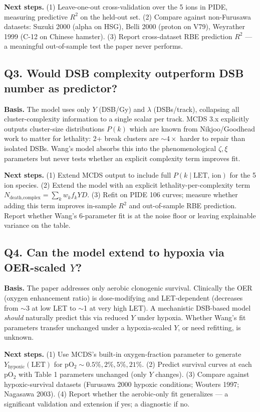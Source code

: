 \textbf{Next steps.} (1) Leave-one-out cross-validation over the 5 ions in PIDE, measuring predictive $R^2$ on the held-out set. (2) Compare against non-Furusawa datasets: Suzuki 2000 (alpha on HSG), Belli 2000 (proton on V79), Weyrather 1999 (C-12 on Chinese hamster). (3) Report cross-dataset RBE prediction $R^2$ --- a meaningful out-of-sample test the paper never performs.

\subsection*{Q3. Would DSB complexity outperform DSB number as predictor?}

\textbf{Basis.} The model uses only $Y$ (DSB/Gy) and $\lambda$ (DSBs/track), collapsing all cluster-complexity information to a single scalar per track. MCDS 3.x explicitly outputs cluster-size distributions $P(k)$ which are known from Nikjoo/Goodhead work to matter for lethality: 2+ break clusters are $\sim 4\times$ harder to repair than isolated DSBs. Wang's model absorbs this into the phenomenological $\zeta,\xi$ parameters but never tests whether an explicit complexity term improves fit.

\textbf{Next steps.} (1) Extend MCDS output to include full $P(k \mid \text{LET, ion})$ for the 5 ion species. (2) Extend the model with an explicit lethality-per-complexity term $N_{\text{death,complex}} = \sum_k w_k f_k Y D$. (3) Refit on PIDE 106 curves; measure whether adding this term improves in-sample $R^2$ and out-of-sample RBE prediction. Report whether Wang's 6-parameter fit is at the noise floor or leaving explainable variance on the table.

\subsection*{Q4. Can the model extend to hypoxia via OER-scaled $Y$?}

\textbf{Basis.} The paper addresses only aerobic clonogenic survival. Clinically the OER (oxygen enhancement ratio) is dose-modifying and LET-dependent (decreases from $\sim$3 at low LET to $\sim$1 at very high LET). A mechanistic DSB-based model \emph{should} naturally predict this via reduced $Y$ under hypoxia. Whether Wang's fit parameters transfer unchanged under a hypoxia-scaled $Y$, or need refitting, is unknown.

\textbf{Next steps.} (1) Use MCDS's built-in oxygen-fraction parameter to generate $Y_{\text{hypoxic}}(\text{LET})$ for pO$_2\sim 0.5\%, 2\%, 5\%, 21\%$. (2) Predict survival curves at each pO$_2$ with Table 1 parameters unchanged (only $Y$ changes). (3) Compare against hypoxic-survival datasets (Furusawa 2000 hypoxic conditions; Wouters 1997; Nagasawa 2003). (4) Report whether the aerobic-only fit generalizes --- a significant validation and extension if yes; a diagnostic if no.

